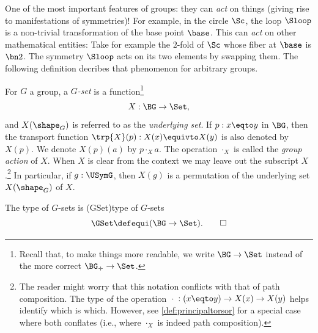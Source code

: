One of the most important features of groups: they can \emph{act} on things
(giving rise to manifestations of symmetries)! For example, in the circle $\Sc$,
the loop $\Sloop$ is a non-trivial transformation of the base point
$\base$. This can \emph{act} on other mathematical entities: Take for example
the $2$-fold \covering of $\Sc$ whose fiber at $\base$ is $\bn 2$. The symmetry
$\Sloop$ acts on its two elements by swapping them. The following definition
decribes that phenomenon for arbitrary groups.


\begin{definition}\label{def:Gset}
  For $G$ a group, a \emph{$G$-set} is a function\footnote{Recall that, to make
    things more readable, we write $\BG\to\Set$ instead of the more correct
    $\BG_\div\to\Set$.}  
  \[
    X : \BG\to\Set,
  \]
  and $X(\sh_G)$ is referred to as the \emph{underlying set}.  If $p:x\eqto y$
  in $\BG$, then the transport function $\trp{X}(p) : X(x)\equivto X(y)$ is also
  denoted by $X(p)$.  We denote $X(p)(a)$ by $p\cdot_X a$.  The operation
  $\cdot_X$ is called the \emph{group action} of $X$.  When $X$ is clear from
  the context we may leave out the subscript $X$.\footnote{%
    The reader might worry that this notation conflicts with that of path
    composition. The type of the operation
    ${}\cdot{}: (x\eqto y) \to X(x) \to X(y)$ helps identify which is which.
    However, see \cref{def:principaltorsor} for a special case where both
    conflates (i.e., where $\cdot_X$ is indeed path composition).}  In
  particular, if $g:\USymG$, then $X(g)$ is a permutation of the underlying set
  $X(\sh_G)$ of $X$.

  The type of $G$-sets is
  \glossary(GSet){\protect{$\GSet$}}{type of $G$-sets}
  \[
    \GSet\defequi(\BG\to\Set).\qedhere
  \]
\end{definition}

